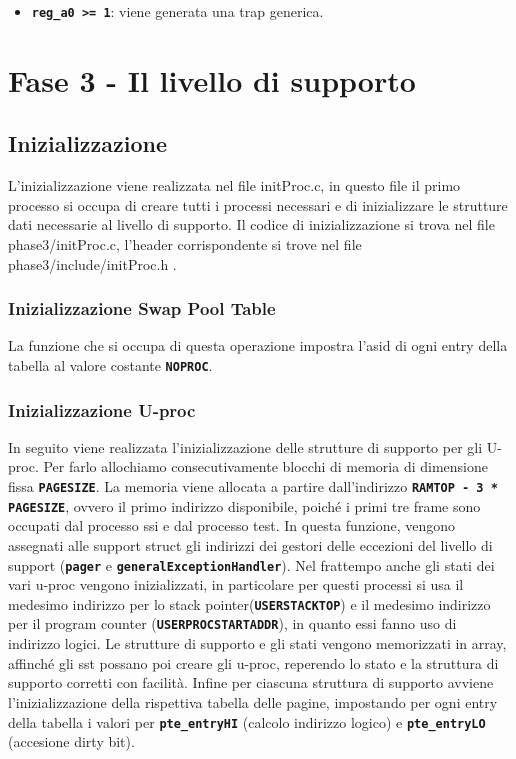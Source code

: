 \documentclass{article}
\begin{document}
\begin{itemize}
		\item \texttt{\textbf{reg\_a0 >= 1}}: viene generata una trap generica.
	\end{itemize}

	\newpage

	\section{Fase 3 - Il livello di supporto}
	\subsection{Inizializzazione}
	L'inizializzazione viene realizzata nel file initProc.c, in questo file il
	primo processo si occupa di creare tutti i processi necessari e di
	inizializzare le strutture dati necessarie al livello di supporto. Il codice di
	inizializzazione si trova nel file phase3/initProc.c, l'header corrispondente
	si trove nel file phase3/include/initProc.h .
	\subsubsection{Inizializzazione Swap Pool Table}
	La funzione che si occupa di questa operazione impostra l'asid di ogni entry
	della tabella al valore costante \texttt{\textbf{NOPROC}}.
	\subsubsection{Inizializzazione U-proc}
	In seguito viene realizzata l'inizializzazione delle strutture di supporto per
	gli U-proc. Per farlo allochiamo consecutivamente blocchi di memoria di dimensione
	fissa \texttt{\textbf{PAGESIZE}}. La memoria viene allocata a partire dall'indirizzo
	\texttt{\textbf{RAMTOP - 3 * PAGESIZE}}, ovvero il primo indirizzo disponibile,
	poiché i primi tre frame sono occupati dal processo ssi e dal processo test. In
	questa funzione, vengono assegnati alle support struct gli indirizzi dei
	gestori delle eccezioni del livello di support (\texttt{\textbf{pager}} e
	\texttt{\textbf{generalExceptionHandler}}). Nel frattempo anche gli stati dei vari
	u-proc vengono inizializzati, in particolare per questi processi si usa il
	medesimo indirizzo per lo stack pointer(\texttt{\textbf{USERSTACKTOP}}) e il
	medesimo indirizzo per il program counter (\texttt{\textbf{USERPROCSTARTADDR}}),
	in quanto essi fanno uso di indirizzo logici. Le strutture di supporto e gli stati
	vengono memorizzati in array, affinché gli sst possano poi creare gli u-proc, reperendo
	lo stato e la struttura di supporto corretti con facilità. Infine per ciascuna
	struttura di supporto avviene l'inizializzazione della rispettiva tabella
	delle pagine, impostando per ogni entry della tabella i valori per \texttt{\textbf{pte\_entryHI}}
	(calcolo indirizzo logico) e \texttt{\textbf{pte\_entryLO}} (accesione dirty
	bit).
\end{document}
